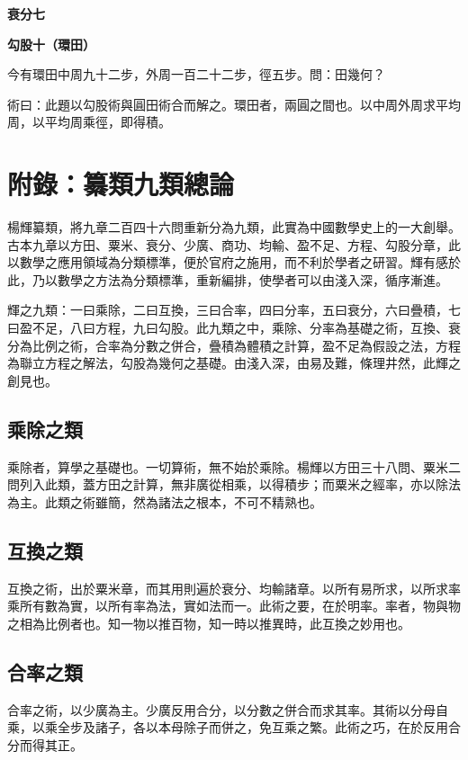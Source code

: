 \documentclass[11pt,a4paper]{article}
\newenvironment{problemenv}[1]{%
  \medskip\noindent\textbf{#1}\par\nopagebreak\smallskip
}{\medskip}
\begin{document}
\begin{problemenv}{衰分七}
\begin{problemenv}{勾股十（環田）}
今有環田中周九十二步，外周一百二十二步，徑五步。問：田幾何？

\textsf{術曰：}此題以勾股術與圓田術合而解之。環田者，兩圓之間也。以中周外周求平均周，以平均周乘徑，即得積。
\end{problemenv}

\newpage

\section*{附錄：纂類九類總論}

楊輝纂類，將九章二百四十六問重新分為九類，此實為中國數學史上的一大創舉。古本九章以方田、粟米、衰分、少廣、商功、均輸、盈不足、方程、勾股分章，此以數學之應用領域為分類標準，便於官府之施用，而不利於學者之研習。輝有感於此，乃以數學之方法為分類標準，重新編排，使學者可以由淺入深，循序漸進。

輝之九類：一曰乘除，二曰互換，三曰合率，四曰分率，五曰衰分，六曰疊積，七曰盈不足，八曰方程，九曰勾股。此九類之中，乘除、分率為基礎之術，互換、衰分為比例之術，合率為分數之併合，疊積為體積之計算，盈不足為假設之法，方程為聯立方程之解法，勾股為幾何之基礎。由淺入深，由易及難，條理井然，此輝之創見也。

\subsection*{乘除之類}

乘除者，算學之基礎也。一切算術，無不始於乘除。楊輝以方田三十八問、粟米二問列入此類，蓋方田之計算，無非廣從相乘，以得積步；而粟米之經率，亦以除法為主。此類之術雖簡，然為諸法之根本，不可不精熟也。

\subsection*{互換之類}

互換之術，出於粟米章，而其用則遍於衰分、均輸諸章。以所有易所求，以所求率乘所有數為實，以所有率為法，實如法而一。此術之要，在於明率。率者，物與物之相為比例者也。知一物以推百物，知一時以推異時，此互換之妙用也。

\subsection*{合率之類}

合率之術，以少廣為主。少廣反用合分，以分數之併合而求其率。其術以分母自乘，以乘全步及諸子，各以本母除子而併之，免互乘之繁。此術之巧，在於反用合分而得其正。


\end{problemenv}
\end{document}
